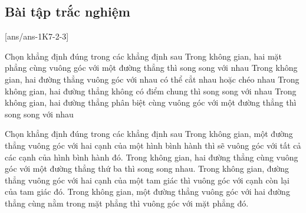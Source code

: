 \subsection{Bài tập trắc nghiệm}
[ans/ans-1K7-2-3]
\begin{ex}%
	Chọn khẳng định đúng trong các khẳng định sau
	\choice
	{Trong không gian, hai mặt phẳng cùng vuông góc với một đường thẳng thì song song với nhau}
	{\True Trong không gian, hai đường thẳng vuông góc với nhau có thể cẳt nhau hoặc chéo nhau}
	{Trong không gian, hai đường thẳng không có điểm chung thì song song với nhau}
	{Trong không gian, hai đường thẳng phân biệt cùng vuông góc với một đường thẳng thì song song với nhau}
\end{ex}

\begin{ex}%
	Chọn khẳng định đúng trong các khẳng định sau
	\choice
	{Trong không gian, một đường thẳng vuông góc với hai cạnh của một hình bình hành thì sẽ vuông góc với tất cả các cạnh của hình bình hành đó.}
	{Trong không gian, hai đường thẳng cùng vuông góc với một đường thẳng thứ ba thì song song nhau.}
	{\True Trong không gian, đường thẳng vuông góc với hai cạnh của một tam giác thì vuông góc với cạnh còn lại của tam giác đó.}
	{Trong không gian, một đường thẳng vuông góc với hai đường thẳng cùng nằm trong mặt phẳng thì vuông góc với mặt phẳng đó.}
\end{ex}

\begin{ex}%
\end{ex}

